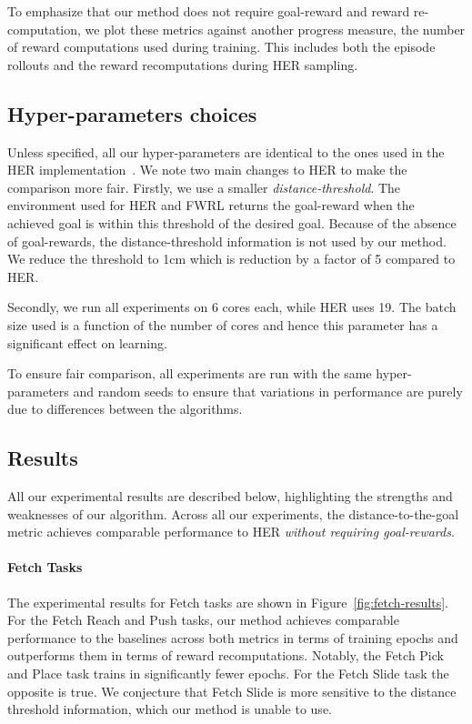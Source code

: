 To emphasize that our method does not require goal-reward
and reward re-computation, we plot these metrics against another
progress measure, the number of reward computations used during
training. This includes both the episode rollouts and the reward recomputations
during HER sampling.

%

\subsection{Hyper-parameters choices} \label{sec:hyperparams}
Unless specified, all our hyper-parameters are identical to the ones
used in the HER
implementation~\citep{dhariwal2017baselines}. We note two main changes
to HER to make the comparison more fair. Firstly,
we use a smaller \emph{distance-threshold}.
The environment used for HER and FWRL returns the goal-reward when the
achieved goal is within this threshold of the desired goal. Because of
the absence of goal-rewards, the distance-threshold information is not used by our
method.
We reduce the threshold to 1cm which is reduction by a factor of 5 compared to
HER.

Secondly, we run all experiments on 6 cores each,
while HER uses 19. The batch size used is a function of the number of
cores and hence this parameter has a significant effect on learning. 

To ensure fair comparison, all experiments are run with the same hyper-parameters and
random seeds to ensure that variations in performance are purely due
to differences between the algorithms.

\subsection{Results}
All our experimental results are described below, highlighting the strengths and
weaknesses of our algorithm. Across all our experiments, the
distance-to-the-goal metric achieves comparable performance to HER
\emph{without requiring goal-rewards}. 

\paragraph{Fetch Tasks}

The experimental results for Fetch tasks are shown in
Figure~\ref{fig:fetch-results}. For the Fetch Reach and Push tasks, our
method achieves comparable performance to the baselines 
across both metrics in terms of training epochs and outperforms them in
terms of reward recomputations. Notably, the Fetch
Pick and Place task trains in significantly fewer epochs. For the Fetch
Slide task the opposite is true.
We conjecture that Fetch Slide is more sensitive to the
distance threshold information, which our method is unable to use.

